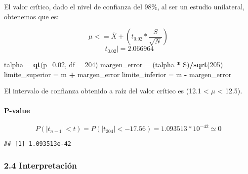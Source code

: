 \documentclass[
]{article}
\newenvironment{Shaded}{\begin{snugshade}}{\end{snugshade}}
\newcommand{\DataTypeTok}[1]{\textcolor[rgb]{0.13,0.29,0.53}{#1}}
\newcommand{\DecValTok}[1]{\textcolor[rgb]{0.00,0.00,0.81}{#1}}
\newcommand{\FloatTok}[1]{\textcolor[rgb]{0.00,0.00,0.81}{#1}}
\newcommand{\KeywordTok}[1]{\textcolor[rgb]{0.13,0.29,0.53}{\textbf{#1}}}
\newcommand{\NormalTok}[1]{#1}
\newcommand{\OperatorTok}[1]{\textcolor[rgb]{0.81,0.36,0.00}{\textbf{#1}}}
\newcommand{\StringTok}[1]{\textcolor[rgb]{0.31,0.60,0.02}{#1}}
\begin{document}
El valor crítico, dado el nivel de confianza del 98\%, al ser un estudio
unilateral, obtenemos que es:

\[\mu <= \bar{X} + (t_{0.02}*\frac{S}{\sqrt{N}})\]
\[|t_{0.02}| = 2.066964\]

\begin{Shaded}
\begin{Highlighting}[]
\NormalTok{talpha =}\StringTok{ }\KeywordTok{qt}\NormalTok{(}\DataTypeTok{p=}\FloatTok{0.02}\NormalTok{, }\DataTypeTok{df =} \DecValTok{204}\NormalTok{)}
\NormalTok{margen_error =}\StringTok{ }\NormalTok{(talpha }\OperatorTok{*}\StringTok{ }\NormalTok{S)}\OperatorTok{/}\KeywordTok{sqrt}\NormalTok{(}\DecValTok{205}\NormalTok{)}
\NormalTok{limite_superior =}\StringTok{ }\NormalTok{m }\OperatorTok{+}\StringTok{ }\NormalTok{margen_error}
\NormalTok{limite_inferior =}\StringTok{ }\NormalTok{m }\OperatorTok{-}\StringTok{ }\NormalTok{margen_error}
\end{Highlighting}
\end{Shaded}

El intervalo de confianza obtenido a raíz del valor crítico es (12.1
\textless{} \(\mu\) \textless{} 12.5).

\hypertarget{p-value}{%
\paragraph{P-value}\label{p-value}}

\[P(|t_{n-1}| < t) = P(|t_{204}| < -17.56) = 1.093513*10^{-42} \simeq 0\]

\begin{Shaded}
\end{Shaded}

\begin{verbatim}
## [1] 1.093513e-42
\end{verbatim}

\hypertarget{interpretaciuxf3n}{%
\subsubsection{2.4 Interpretación}\label{interpretaciuxf3n}}
\end{document}
